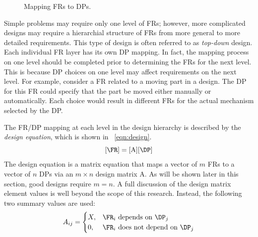 \begin{figure}[H]
  \centering
  \caption{Mapping FRs to DPs.}
  \label{fig:mapping}
\end{figure}

Simple problems may require only one level of FRs; however, more complicated designs may require a hierarchial
structure of FRs from more general to more detailed requirements.  This type of design is often referred to as
\emph{top-down} design.  Each individual FR layer has its own DP mapping.  In fact, the mapping process on one
level should be completed prior to determining the FRs for the next level.  This is because DP choices on one level
may affect requirements on the next level.  For example, consider a FR related to a moving part in a design.  The
DP for this FR could specify that the part be moved either manually or automatically.  Each choice would result in
different FRs for the actual mechanism selected by the DP.

The FR/DP mapping at each level in the design hierarchy is described by the \emph{design equation}, which is shown
in \equationname~\ref{eqn:design}.
\begin{equation}
  \label{eqn:design}
  [\FR]=[\text{A}][\DP]
\end{equation}
The design equation is a matrix equation that maps a vector of \(m\) FRs to a vector of \(n\) DPs via an \(m\times
n\) design matrix A.  As will be shown later in this section, good designs require \(m=n\).  A full discussion of
the design matrix element values is well beyond the scope of this research.  Instead, the following two summary
values are used:
\[A_{ij}=\begin{cases}
X, & \FR_i\ \text{depends on}\ \DP_j \\
0, & \FR_i\ \text{does not depend on}\ \DP_j
\end{cases}\]

